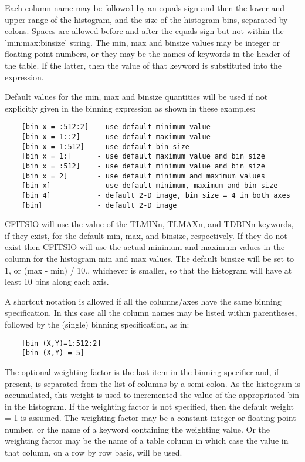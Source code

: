 \documentclass[11pt]{book}
\begin{document}
Each column name may be followed by an equals sign and then the lower
and upper range of the histogram, and the size of the histogram bins,
separated by colons.  Spaces are allowed before and after the equals
sign but not within the 'min:max:binsize' string.  The min, max and
binsize values may be integer or floating point numbers, or they may be
the names of keywords in the header of the table.  If the latter, then
the value of that keyword is substituted into the expression.

Default values for the min, max and binsize quantities will be
used if not explicitly given in the binning expression as shown
in these examples:

\begin{verbatim}
    [bin x = :512:2]  - use default minimum value
    [bin x = 1::2]    - use default maximum value
    [bin x = 1:512]   - use default bin size
    [bin x = 1:]      - use default maximum value and bin size
    [bin x = :512]    - use default minimum value and bin size
    [bin x = 2]       - use default minimum and maximum values
    [bin x]           - use default minimum, maximum and bin size
    [bin 4]           - default 2-D image, bin size = 4 in both axes
    [bin]             - default 2-D image
\end{verbatim}
CFITSIO  will use the value of the TLMINn, TLMAXn, and TDBINn keywords,
if they exist, for the default min, max, and binsize, respectively.  If
they do not exist then CFITSIO will use the actual minimum and maximum
values in the column for the histogram min and max values.  The default
binsize will be set to 1, or (max - min) / 10., whichever is smaller,
so that the histogram will have at least 10 bins along each axis.

A shortcut notation is allowed if all the columns/axes have the same
binning specification.  In this case all the column names may be listed
within parentheses, followed by the (single) binning specification, as
in:

\begin{verbatim}
    [bin (X,Y)=1:512:2]
    [bin (X,Y) = 5]
\end{verbatim}

The optional weighting factor is the last item in the binning specifier
and, if present, is separated from the list of columns by a
semi-colon.  As the histogram is accumulated, this weight is used to
incremented the value of the appropriated bin in the histogram.  If the
weighting factor is not specified, then the default weight = 1 is
assumed.  The weighting factor may be a constant integer or floating
point number, or the name of a keyword containing the weighting value.
Or the weighting factor may be the name of a table column in which case
the value in that column, on a row by row basis, will be used.
\end{document}

